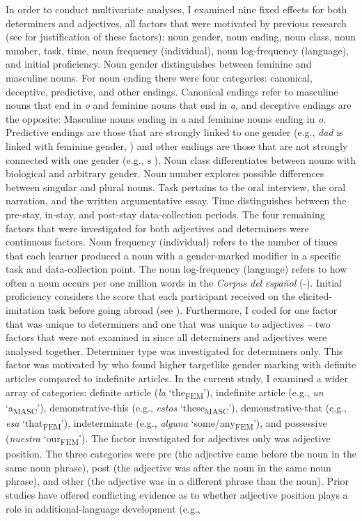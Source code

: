 \documentclass[output=paper,colorlinks,citecolor=brown,modfonts,nonflat]{../langscibook}
\begin{document}
In order to conduct multivariate analyses, I examined nine fixed effects for both determiners and adjectives, all factors that were motivated by previous research (see \citealt{GudmestadEtAl2019} for justification of these factors): noun gender, noun ending, noun class, noun number, task, time, noun frequency (individual), noun log-frequency (language), and initial proficiency. Noun gender distinguishes between feminine and masculine nouns. For noun ending there were four categories: canonical, deceptive, predictive, and other endings. Canonical endings refer to masculine nouns that end in \textit{o} and feminine nouns that end in \textit{a}, and deceptive endings are the opposite: Masculine nouns ending in \textit{a} and feminine nouns ending in \textit{o}. Predictive endings are those that are strongly linked to one gender (e.g., \textit{dad} is linked with feminine gender, \citealt{TeschnerRussell1984}) and other endings are those that are not strongly connected with one gender (e.g., \textit{s} \citealt{TeschnerRussell1984}). Noun class differentiates between nouns with biological and arbitrary gender. Noun number explores possible differences between singular and plural nouns. Task pertains to the oral interview, the oral narration, and the written argumentative essay. Time distinguishes between the pre-stay, in-stay, and post-stay data-collection periods. The four remaining factors that were investigated for both adjectives and determiners were continuous factors. Noun frequency (individual) refers to the number of times that each learner produced a noun with a gender-marked modifier in a specific task and data-collection point. The noun log-frequency (language) refers to how often a noun occurs per one million words in the \textit{Corpus} \textit{del} \textit{español} (\citealt{Davies2016}-). Initial proficiency considers the score that each participant received on the elicited-imitation task before going abroad (see ). Furthermore, I coded for one factor that was unique to determiners and one that was unique to adjectives – two factors that were not examined in \citeauthor{GudmestadEtAl2019} since all determiners and adjectives were analysed together. Determiner type was investigated for determiners only. This factor was motivated by \citet{GaravitoWhite2002} who found higher targetlike gender marking with definite articles compared to indefinite articles. In the current study, I examined a wider array of categories: definite article (\textit{la} ‘the\textsubscript{FEM}’), indefinite article (e.g., \textit{un} ‘a\textsubscript{MASC}’), demonstrative-this (e.g., \textit{estos} ‘these\textsubscript{MASC}’), demonstrative-that (e.g., \textit{esa} ‘that\textsubscript{FEM}’), indeterminate (e.g., \textit{alguna} ‘some/any\textsubscript{FEM}’), and possessive (\textit{nuestra} ‘our\textsubscript{FEM}’). The factor investigated for adjectives only was adjective position. The three categories were pre (the adjective came before the noun in the same noun phrase), post (the adjective was after the noun in the same noun phrase), and other (the adjective was in a different phrase than the noun). Prior studies have offered conflicting evidence as to whether adjective position plays a role in additional-language development (e.g., 
\end{document}
